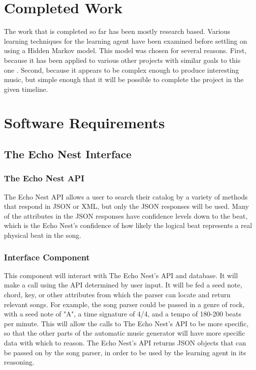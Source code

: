 \documentclass{article}
\begin{document}
\section{Completed Work}
The work that is completed so far has been mostly research based. Various learning techniques for the learning agent have been examined before settling on using a Hidden Markov model. This model was chosen for several reasons. First, because it has been applied to various other projects with similar goals to this one \cite{761266, 1394661} . Second, because it appears to be complex enough to produce interesting music, but simple enough that it will be possible to complete the project in the given timeline.\\

\section{Software Requirements}
\subsection{The Echo Nest Interface}
\subsubsection{The Echo Nest API}
The Echo Nest API allows a user to search their catalog by a variety of methods that respond in JSON or XML, but only the JSON responses will be used.  Many of the attributes in the JSON responses have confidence levels down to the beat, which is the Echo Nest's confidence of how likely the logical beat represents a real physical beat in the song.

\subsubsection{Interface Component}
This component will interact with The Echo Nest's API and database. It will make a call using the API determined by user input. It will be fed a seed note, chord, key, or other attributes from which the parser can locate and return relevant songs. For example, the song parser could be passed in a genre of rock, with a seed note of "A", a time signature of 4/4, and a tempo of 180-200 beats per minute. This will allow the calls to The Echo Nest's API to be more specific, so that the other parts of the automatic music generator will have more specific data with which to reason. The Echo Nest's API returns JSON objects that can be passed on by the song parser, in order to be used by the learning agent in its reasoning.
\end{document}
